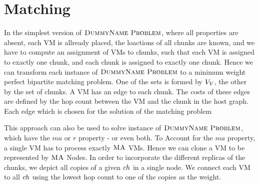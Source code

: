 \section{Matching}

In the simplest version of $\textsc{DummyName Problem}$, where all properties are absent, each VM 
is allready placed, the loactions of all chunks are known, and we have to 
compute an assignment of VMs to chunks, such that each VM is assigned to 
exactly one chunk, and each chunk is assigned to exactly one chunk. Hence we 
can transform each instance of $\textsc{DummyName Problem}$ to a minimum weight perfect bipartite 
matching problem. One of the sets is formed by $V_V$, the other by the 
set of chunks. A VM has an edge to each chunk. The costs of these edges are 
defined by the hop count between the VM and the chunk in the host graph. Each 
edge which is chosen for the solution of the matching problem


This approach can also be used to solve instance of $\textsc{DummyName Problem}$, which have the 
$ma$ or $r$ property - or even both. 
To Account for the $ma$ property, a single VM has to process exactly 
$\textsc{MA}$ VMs. Hence we can clone a VM to be represented by $\textsc{MA}$ Nodes.
In order to incorporate the different 
replicas of the chunks, we depict all copies of a given $ch$ in a 
single %
node. We connect each VM to all $ch$ using the 
lowest hop count to one of the copies as the weight.
